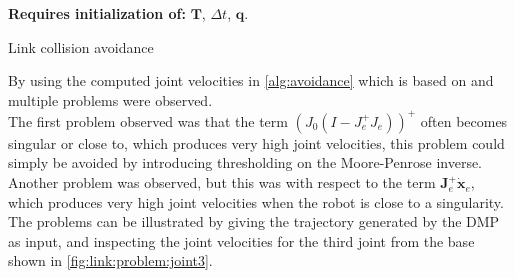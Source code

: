 \documentclass[../main.tex]{subfiles}
\begin{document}
\begin{algorithm}[H]
 \SetAlgoLined
 \textbf{Requires initialization of: }$\boldsymbol{T}$, $\Delta t$, $\boldsymbol{q}$.\\
 \caption{Link collision avoidance}
 \label{alg:avoidance}
\end{algorithm}
By using the computed joint velocities in \autoref{alg:avoidance} which is based on \cite{maciejewski_obstacle_1985} and \cite{dae-hyung_park_movement_2008} multiple problems were observed.\\

The first problem observed was that the term $(J_0(I - J_e^+ J_e))^+$ often becomes singular or close to, which produces very high joint velocities, this problem could simply be avoided by introducing thresholding on the Moore-Penrose inverse. Another problem was observed, but this was with respect to the term $\boldsymbol{J}^+_e\dot{\boldsymbol{x}}_e$, which produces very high joint velocities when the robot is close to a singularity.\\
The problems can be illustrated by giving the trajectory generated by the DMP as input, and inspecting the joint velocities for the third joint from the base shown in \autoref{fig:link:problem:joint3}.
\end{document}
